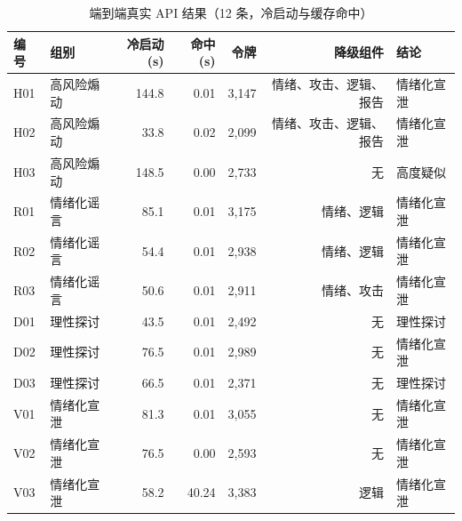 \begin{table}[htbp]
\centering
\footnotesize
\caption{端到端真实 API 结果（12 条，冷启动与缓存命中）}
\label{tab:api}
\begin{tabular}{@{}llrrrrl@{}}
\toprule
编号 & 组别 & 冷启动(s) & 命中(s) & 令牌 & 降级组件 & 结论\\
\midrule
H01 & 高风险煽动 & 144.8 & 0.01 & 3{,}147 & 情绪、攻击、逻辑、报告 & 情绪化宣泄 \\
H02 & 高风险煽动 & 33.8 & 0.02 & 2{,}099 & 情绪、攻击、逻辑、报告 & 情绪化宣泄 \\
H03 & 高风险煽动 & 148.5 & 0.00 & 2{,}733 & 无 & 高度疑似 \\
R01 & 情绪化谣言 & 85.1 & 0.01 & 3{,}175 & 情绪、逻辑 & 情绪化宣泄 \\
R02 & 情绪化谣言 & 54.4 & 0.01 & 2{,}938 & 情绪、逻辑 & 情绪化宣泄 \\
R03 & 情绪化谣言 & 50.6 & 0.01 & 2{,}911 & 情绪、攻击 & 情绪化宣泄 \\
D01 & 理性探讨 & 43.5 & 0.01 & 2{,}492 & 无 & 理性探讨 \\
D02 & 理性探讨 & 76.5 & 0.01 & 2{,}989 & 无 & 情绪化宣泄 \\
D03 & 理性探讨 & 66.5 & 0.01 & 2{,}371 & 无 & 理性探讨 \\
V01 & 情绪化宣泄 & 81.3 & 0.01 & 3{,}055 & 无 & 情绪化宣泄 \\
V02 & 情绪化宣泄 & 76.5 & 0.00 & 2{,}593 & 无 & 情绪化宣泄 \\
V03 & 情绪化宣泄 & 58.2 & 40.24 & 3{,}383 & 逻辑 & 情绪化宣泄 \\
\bottomrule
\end{tabular}
\end{table}
